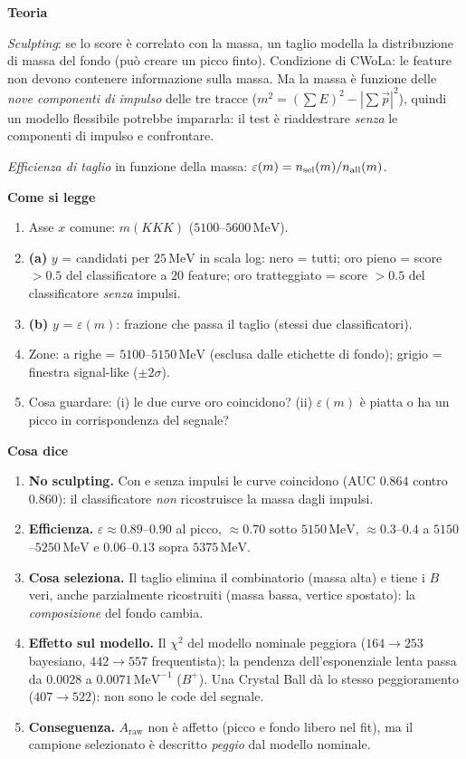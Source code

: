 \documentclass[10.5pt,a4paper]{article}
\newcommand{\Araw}{A_{\mathrm{raw}}}
\newcommand{\MeV}{\,\mathrm{MeV}}
\newcommand{\sez}[1]{\par\Needspace{6\baselineskip}\medskip\noindent\textbf{\large #1}\par\nopagebreak\smallskip}
\begin{document}
\sez{Teoria}
\emph{Sculpting}: se lo score è correlato con la massa, un taglio modella la distribuzione di massa del fondo (può creare un picco finto). Condizione di CWoLa: le feature non devono contenere informazione sulla massa. Ma la massa è funzione delle \emph{nove componenti di impulso} delle tre tracce ($m^2=(\sum E)^2-|\sum\vec p|^2$), quindi un modello flessibile potrebbe impararla: il test è riaddestrare \emph{senza} le componenti di impulso e confrontare.

\emph{Efficienza di taglio} in funzione della massa: $\varepsilon(m)=n_{\rm sel}(m)/n_{\rm all}(m)$.

\sez{Come si legge}
\begin{enumerate}
\item Asse $x$ comune: $m(KKK)$ ($5100$--$5600\MeV$).
\item \textbf{(a)} $y$ = candidati per $25\MeV$ in scala log: nero = tutti; oro pieno = score $>0.5$ del classificatore a $20$ feature; oro tratteggiato = score $>0.5$ del classificatore \emph{senza} impulsi.
\item \textbf{(b)} $y$ = $\varepsilon(m)$: frazione che passa il taglio (stessi due classificatori).
\item Zone: a righe = $5100$--$5150\MeV$ (esclusa dalle etichette di fondo); grigio = finestra signal-like ($\pm2\sigma$).
\item Cosa guardare: (i) le due curve oro coincidono? (ii) $\varepsilon(m)$ è piatta o ha un picco in corrispondenza del segnale?
\end{enumerate}

\sez{Cosa dice}
\begin{enumerate}
\item \textbf{No sculpting.} Con e senza impulsi le curve coincidono (AUC $0.864$ contro $0.860$): il classificatore \emph{non} ricostruisce la massa dagli impulsi.
\item \textbf{Efficienza.} $\varepsilon\approx0.89$--$0.90$ al picco, $\approx0.70$ sotto $5150\MeV$, $\approx0.3$--$0.4$ a $5150$--$5250\MeV$ e $0.06$--$0.13$ sopra $5375\MeV$.
\item \textbf{Cosa seleziona.} Il taglio elimina il combinatorio (massa alta) e tiene i $B$ veri, anche parzialmente ricostruiti (massa bassa, vertice spostato): la \emph{composizione} del fondo cambia.
\item \textbf{Effetto sul modello.} Il $\chi^2$ del modello nominale peggiora ($164\to253$ bayesiano, $442\to557$ frequentista); la pendenza dell'esponenziale lenta passa da $0.0028$ a $0.0071\MeV^{-1}$ ($B^+$). Una Crystal Ball dà lo stesso peggioramento ($407\to522$): non sono le code del segnale.
\item \textbf{Conseguenza.} $\Araw$ non è affetto (picco e fondo libero nel fit), ma il campione selezionato è descritto \emph{peggio} dal modello nominale.
\end{enumerate}
\end{document}
